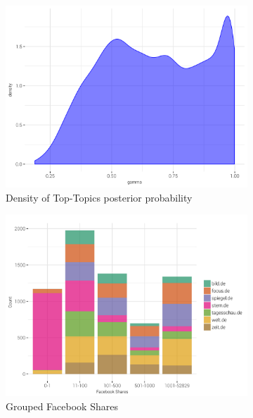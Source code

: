 \documentclass[12pt,a4paper,notitlepage]{article}
\begin{document}
\begin{figure}[H]
	\caption{}
	\begin{center}
		\begin{subfigure}[normla]{0.49\textwidth}
			\includegraphics[width=\textwidth,keepaspectratio]{../figs/gamma_dist.png}
			\caption{Density of Top-Topics posterior probability}
			\label{fig_gamma}
		\end{subfigure}
		\begin{subfigure}[normla]{0.49\textwidth}
			\includegraphics[width=\textwidth,keepaspectratio]{../figs/facebook_shares.png}
			\caption{Grouped Facebook Shares}
			\label{fig_fb_shares}
		\end{subfigure}
		\begin{subfigure}[normla]{0.9\textwidth}

\end{subfigure}
\end{center}
\end{figure}
\end{document}
